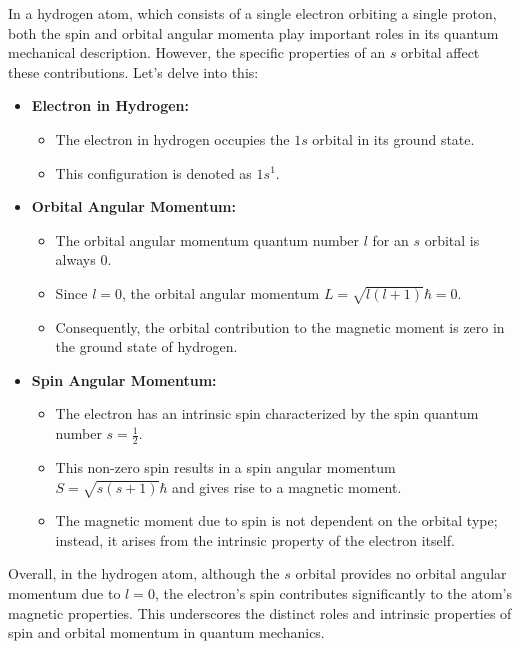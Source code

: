 \begin{airesult}
In a hydrogen atom, which consists of a single electron orbiting a single proton, both the spin and
orbital angular momenta play important roles in its quantum mechanical description. However, the
specific properties of an \(s\) orbital affect these contributions. Let's delve into this:

\vsp

\begin{itemize}
\item \textbf{Electron in Hydrogen:}

  \begin{itemize}
  \item The electron in hydrogen occupies the \(1s\) orbital in its ground state.
  \item This configuration is denoted as \(1s^1\).
  \end{itemize}

\item \textbf{Orbital Angular Momentum:}

  \begin{itemize}
  \item The orbital angular momentum quantum number \(l\) for an \(s\) orbital is always 0.
  \item Since \(l = 0\), the orbital angular momentum \( L = \sqrt{l(l+1)} \hbar = 0 \).
  \item Consequently, the orbital contribution to the magnetic moment is zero in the ground state of
hydrogen.
  \end{itemize}

\item \textbf{Spin Angular Momentum:}

  \begin{itemize}
  \item The electron has an intrinsic spin characterized by the spin quantum number \( s =
\frac{1}{2} \).
  \item This non-zero spin results in a spin angular momentum \( S = \sqrt{s(s+1)} \hbar \) and
gives rise to a magnetic moment.
  \item The magnetic moment due to spin is not dependent on the orbital type; instead, it arises
from the intrinsic property of the electron itself.
  \end{itemize}

\end{itemize}

\vsp

Overall, in the hydrogen atom, although the \(s\) orbital provides no orbital angular momentum due
to \(l = 0\), the electron’s spin contributes significantly to the atom’s magnetic properties. This
underscores the distinct roles and intrinsic properties of spin and orbital momentum in quantum
mechanics.
\end{airesult}

